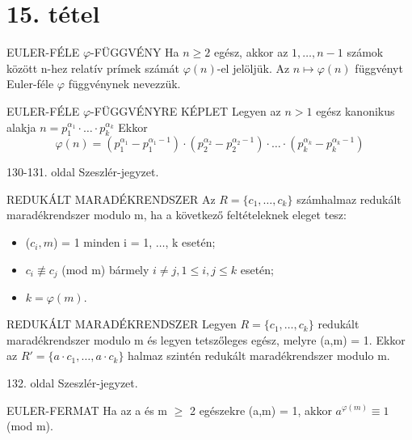 \section{15. tétel}

\begin{definicio}{EULER-FÉLE $\varphi$-FÜGGVÉNY}
Ha $n \geq 2$ egész, akkor az $1,\ldots,n-1$ számok között n-hez relatív prímek számát $\varphi(n)$-el jelöljük. Az $n\mapsto\varphi(n)$ függvényt Euler-féle $\varphi$ függvénynek nevezzük.
\end{definicio}

\begin{tetel}{EULER-FÉLE $\varphi$-FÜGGVÉNYRE KÉPLET}
Legyen az $n > 1$ egész kanonikus alakja $n = p_1^{\alpha_1} \cdot \ldots \cdot p_k^{\alpha_k}$ Ekkor $$\varphi(n) = \left(p_1^{\alpha_1} - p_1^{\alpha_1-1}\right) \cdot \left(p_2^{\alpha_2} - p_2^{\alpha_2-1}\right) \cdot \ldots \cdot
\left(p_k^{\alpha_k} - p_k^{\alpha_k-1}\right)$$
\end{tetel}

\begin{bizonyitas}{}
130-131. oldal Szeszlér-jegyzet.
\end{bizonyitas}

\begin{definicio}{REDUKÁLT MARADÉKRENDSZER}
Az $R = \{c_1, \ldots, c_k\}$ számhalmaz redukált maradékrendszer modulo m, ha a következő feltételeknek eleget tesz:
\begin{itemize}
\item ($c_i, m$) = 1 minden i = 1, $\ldots$, k esetén;
\item $c_i \not \equiv c_j$ (mod m) bármely $i \neq j, 1 \leq i, j \leq k$ esetén;
\item $k = \varphi(m).$
\end{itemize}
\end{definicio}

\begin{tetel}{REDUKÁLT MARADÉKRENDSZER}
Legyen $R = \{c_1, \ldots, c_k\}$ redukált maradékrendszer modulo m és legyen tetszőleges egész, melyre (a,m) = 1. Ekkor az $R' = \{a\cdot c_1, \ldots, a \cdot c_k\}$ halmaz szintén redukált maradékrendszer modulo m.
\end{tetel}

\begin{bizonyitas}{}
132. oldal Szeszlér-jegyzet.
\end{bizonyitas}

\begin{tetel}{EULER-FERMAT}
Ha az a és m $\geq$ 2 egészekre (a,m) = 1, akkor $a^{\varphi(m)} \equiv 1$ (mod m).
\end{tetel}


